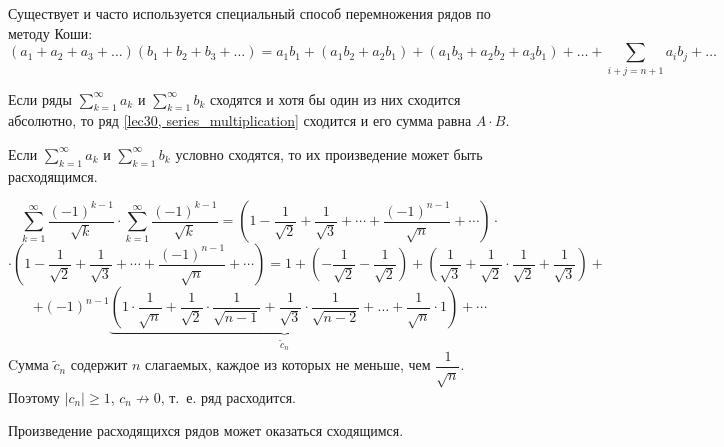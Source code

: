 \documentclass[../../main.tex]{subfiles}
\begin{document}
Существует и часто используется специальный способ перемножения рядов по методу Коши:
\[(a_1 + a_2 + a_3 + \ldots)(b_1 + b_2 + b_3 + \ldots) = a_1 b_1 +
(a_1 b_2 + a_2 b_1) + (a_1 b_3 + a_2 b_2 + a_3 b_1) + \ldots +
\sum\limits_{i + j = n + 1} a_i b_j + \ldots\]
\begin{thm}[Мертенс]
Если ряды $\sum\limits_{k = 1}^{\infty} a_k$ и
$\sum\limits_{k = 1}^{\infty} b_k$ сходятся и хотя бы один из них
сходится абсолютно, то ряд \eqref{lec30, series_multiplication} сходится
и его сумма равна $A \cdot B$.
\end{thm}

Если $\sum\limits_{k = 1}^{\infty} a_k$ и
$\sum\limits_{k = 1}^{\infty} b_k$ условно сходятся, то их произведение
может быть расходящимся.
\begin{example}
	\[\sum\limits_{k = 1}^{\infty} \frac{(-1)^{k-1}}{\sqrt{k}} \cdot
	\sum\limits_{k = 1}^{\infty} \frac{(-1)^{k-1}}{\sqrt{k}} =
	\left(1 - \frac{1}{\sqrt{2}} + \frac{1}{\sqrt{3}} + \cdots +
	\frac{(-1)^{n-1}}{\sqrt{n}} + \cdots \right) \cdot \]
	\[\cdot \left(1 - \frac{1}{\sqrt{2}} + \frac{1}{\sqrt{3}} + \cdots +
	\frac{(-1)^{n-1}}{\sqrt{n}} + \cdots \right) = 1 +
	\left( - \frac{1}{\sqrt{2}} - \frac{1}{\sqrt{2}} \right) +
	\left( \frac{1}{\sqrt{3}} + \frac{1}{\sqrt{2}} \cdot
	\frac{1}{\sqrt{2}} + \frac{1}{\sqrt{3}} \right) + \] 
	\[ + \left( -1 \right) ^ {n - 1}
	\underbrace{\left(1 \cdot \frac{1}{\sqrt{n}} + \frac{1}{\sqrt{2}} \cdot
	\frac{1}{\sqrt{n - 1}} + \frac{1}{\sqrt{3}} \cdot
	\frac{1}{\sqrt{n - 2}} + \ldots + \frac{1}{\sqrt{n}}
	\cdot 1\right)}_{\widetilde{c}_n} + \cdots \]
	Cумма $\widetilde{c}_n$ содержит $n$ слагаемых, каждое из которых не меньше,
	чем $\dfrac{1}{\sqrt{n}}$. Поэтому $|c_n| \geq 1$, $c_n \not\to 0$, т.~е.
	ряд расходится.
\end{example}
\begin{remark}
	Произведение расходящихся рядов может оказаться сходящимся.
\end{remark}
\end{document}
